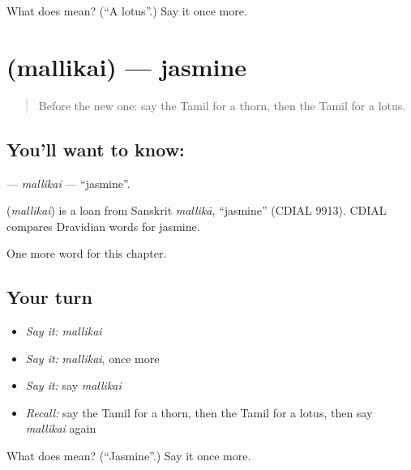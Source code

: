 \begin{tcolorbox}[breakable,colback=teal!4,colframe=teal!35!black,title={Before you move on}]
What does  mean? (\textquotedblleft{}A lotus\textquotedblright{}.) Say it once more.
\end{tcolorbox}
\section[\texorpdfstring{\ta{மல்லிகை} (mallikai)}{மல்லிகை (mallikai)}]{ (mallikai) — jasmine}

\label{lesson:TA-C188-mallikai}



\begin{quote}
Before the new one: say the Tamil for a thorn, then the Tamil for a lotus.
\end{quote}

\subsection*{You'll want to know: }
\textbf{} — \emph{mallikai} — \textquotedblleft{}jasmine\textquotedblright{}.

\begin{cousinweb}
\textbf{} (\emph{mallikai}) is a loan from Sanskrit \emph{mallikā}, \textquotedblleft{}jasmine\textquotedblright{} (CDIAL 9913). CDIAL compares Dravidian words for jasmine.
\end{cousinweb}

\begin{grammarlens}[title={What you've built}]
One more word for this chapter.
\end{grammarlens}

\subsection*{Your turn}
\begin{itemize}
\raggedright
  \item \emph{Say it:} \emph{mallikai}
  \item \emph{Say it:} \emph{mallikai}, once more
  \item \emph{Say it:} say \emph{mallikai}
  \item \emph{Recall:} say the Tamil for a thorn, then the Tamil for a lotus, then say \emph{mallikai} again
\end{itemize}

\begin{tcolorbox}[breakable,colback=teal!4,colframe=teal!35!black,title={Before you move on}]
What does  mean? (\textquotedblleft{}Jasmine\textquotedblright{}.) Say it once more.
\end{tcolorbox}
